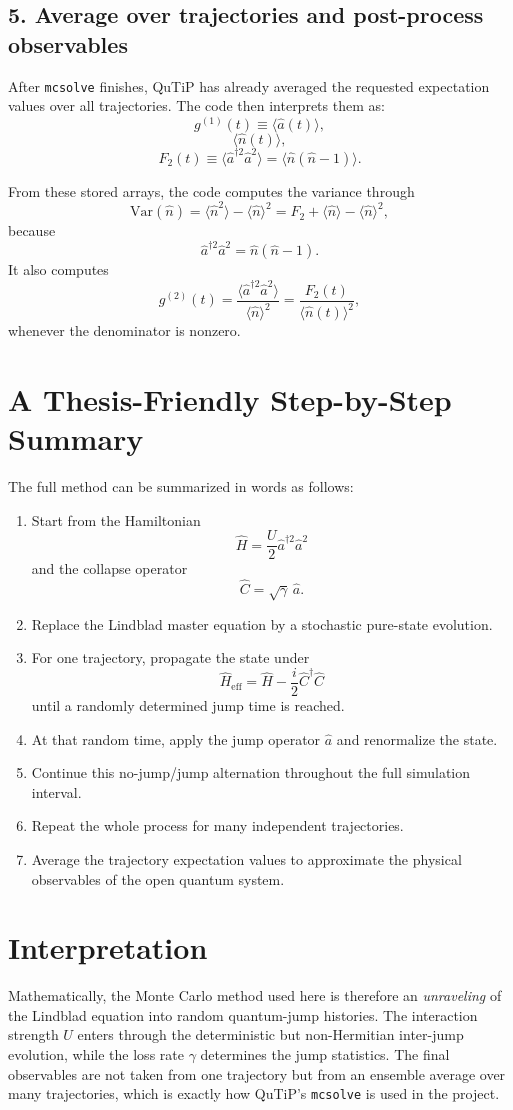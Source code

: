 \documentclass[12pt]{article}
\begin{document}
\subsection*{5. Average over trajectories and post-process observables}
After \texttt{mcsolve} finishes, QuTiP has already averaged the requested expectation values over all trajectories. The code then interprets them as:
\[
g^{(1)}(t) \equiv \langle \hat a(t)\rangle,
\]
\[
\langle \hat n(t)\rangle,
\]
\[
F_2(t) \equiv \langle \hat a^{\dagger 2}\hat a^2\rangle
= \langle \hat n(\hat n-1)\rangle.
\]

From these stored arrays, the code computes the variance through
\[
\mathrm{Var}(\hat n)
= \langle \hat n^2\rangle - \langle \hat n\rangle^2
= F_2 + \langle \hat n\rangle - \langle \hat n\rangle^2,
\]
because
\[
\hat a^{\dagger 2}\hat a^2 = \hat n(\hat n-1).
\]
It also computes
\[
g^{(2)}(t)
= \frac{\langle \hat a^{\dagger 2}\hat a^2\rangle}{\langle \hat n\rangle^2}
= \frac{F_2(t)}{\langle \hat n(t)\rangle^2},
\]
whenever the denominator is nonzero.

\section*{A Thesis-Friendly Step-by-Step Summary}
The full method can be summarized in words as follows:
\begin{enumerate}
\item Start from the Hamiltonian
\[
\hat H = \frac{U}{2}\hat a^{\dagger 2}\hat a^2
\]
and the collapse operator
\[
\hat C=\sqrt{\gamma}\,\hat a.
\]
\item Replace the Lindblad master equation by a stochastic pure-state evolution.
\item For one trajectory, propagate the state under
\[
\hat H_{\mathrm{eff}}=\hat H-\frac{i}{2}\hat C^\dagger \hat C
\]
until a randomly determined jump time is reached.
\item At that random time, apply the jump operator $\hat a$ and renormalize the state.
\item Continue this no-jump/jump alternation throughout the full simulation interval.
\item Repeat the whole process for many independent trajectories.
\item Average the trajectory expectation values to approximate the physical observables of the open quantum system.
\end{enumerate}

\section*{Interpretation}
Mathematically, the Monte Carlo method used here is therefore an \emph{unraveling} of the Lindblad equation into random quantum-jump histories. The interaction strength $U$ enters through the deterministic but non-Hermitian inter-jump evolution, while the loss rate $\gamma$ determines the jump statistics. The final observables are not taken from one trajectory but from an ensemble average over many trajectories, which is exactly how QuTiP's \texttt{mcsolve} is used in the project.
\end{document}
